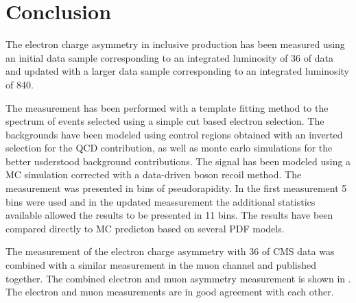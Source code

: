 \chapter{Conclusion}
\label{chap:conclusion}

The electron charge asymmetry in inclusive \PW production has been measured
using an initial data sample corresponding to an integrated luminosity of
\unit{36}{\invpb} of data and updated with a larger data sample corresponding to
an integrated luminosity of \unit{840}{\invpb}.

The measurement has been performed with a template fitting method to the \ETm
spectrum of events selected using a simple cut based electron selection.
The backgrounds have been modeled using control regions obtained with an
inverted selection for the QCD contribution, as well as monte carlo simulations
for the better usderstood background contributions.
The signal has been modeled using a MC simulation corrected with a data-driven
boson recoil method.
The measurement was presented in bins of pseudorapidity. In the first
measurement 5 bins were used and in the updated meassurement the additional
statistics available allowed the results to be presented in 11 bins.
The results have been compared directly to MC predicton based on several PDF
models. 


The measurement of the electron charge asymmetry with
\unit{36}{\invpb} of CMS data\cite{baisini2010electron} was combined with a
similar measurement in the muon channel\cite{majumder2010muon} and published
together\cite{asym36}.  The combined electron and muon asymmetry measurement is
shown in . The electron and muon measurements are in
good agreement with each other.

